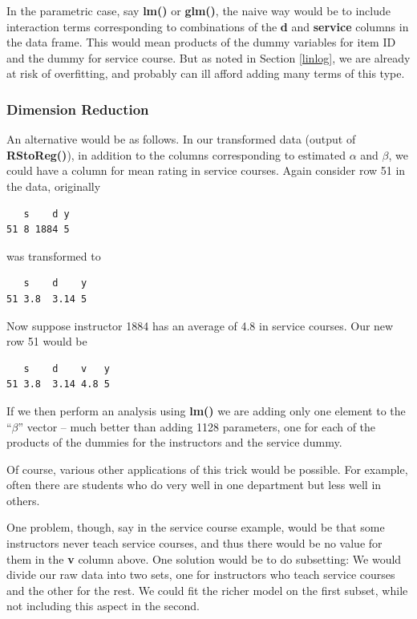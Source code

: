 In the parametric case, say \textbf{lm()} or \textbf{glm()},
the naive way would be to include interaction terms corresponding to
combinations of the \textbf{d} and \textbf{service} columns in the data
frame.  This would mean products of the dummy variables for item ID and
the dummy for service course.  But as noted in Section \ref{linlog}, we
are already at risk of overfitting, and probably can ill afford adding
many terms of this type.

\subsubsection{Dimension Reduction}

An alternative would be as follows.  In our transformed data (output of
\textbf{RStoReg()}), in addition to the columns corresponding to
estimated $\alpha$ and $\beta$, we could have a column for mean rating
in service courses.  Again consider row 51 in the data, originally

\begin{lstlisting}
   s    d y 
51 8 1884 5       
\end{lstlisting}

was transformed to

\begin{lstlisting}
   s    d    y 
51 3.8  3.14 5       
\end{lstlisting}

Now suppose instructor 1884 has an average of 4.8 in service courses.
Our new row 51 would be

\begin{lstlisting}
   s    d    v   y 
51 3.8  3.14 4.8 5       
\end{lstlisting}

If we then perform an analysis using \textbf{lm()} we are adding only
one element to the ``$\beta$'' vector -- much better than adding 1128
parameters, one for each of the products of the dummies for the
instructors and the service dummy.

Of course, various other applications of this trick would be possible.
For example, often there are students who do very well in one department
but less well in others.

One problem, though, say in the service course example, would be that
some instructors never teach service courses, and thus there would be no
value for them in the \textbf{v} column above.  One solution would be to
do subsetting:  We would divide our raw data into two sets, one for
instructors who teach service courses and the other for the rest.  We
could fit the richer model on the first subset, while not including this
aspect in the second.


